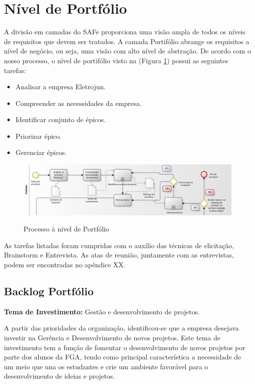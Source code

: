 \section {Nível de Portfólio}

A divisão em camadas do SAFe proporciona uma visão ampla de todos os níveis de requisitos que devem ser tratados. A camada Portifólio abrange os requisitos a nível de negócio, ou seja, uma visão com alto nível de abstração. De acordo com o nosso processo, o nível de portifólio visto na (Figura \ref{img:portfolio}) possui as seguintes tarefas:

\begin{itemize}
\item Analisar a empresa Eletrojun.
\item Compreender as necessidades da empresa.
\item Identificar conjunto de épicos.
\item Priorizar épico.
\item Gerenciar épicos.
\end{itemize}

\FloatBarrier
\begin{figure}[!htpd]
		\centering
		\includegraphics[scale=0.4]{figuras/portfolio}
		\label{img:portfolio}
		\caption{Processo à nível de Portfólio}
\end{figure}

As tarefas listadas foram cumpridas com o auxílio das técnicas de elicitação, Brainstorm e Entrevista. As atas de reunião, juntamente com as entrevistas, podem ser encontradas no apêndice XX.

\subsection {Backlog Portfólio}

\textbf{Tema de Investimento:} Gestão e desenvolvimento de projetos.

 A partir das prioridades da organização, identificou-se que a empresa desejava investir na Gerência e Desenvolvimento de novos projetos. Este tema de investimento tem a função de fomentar o desenvolvimento de novos projetos por parte dos alunos da FGA, tendo como principal característica a necessidade de um meio que una os estudantes e crie um ambiente favorável para o desenvolvimento de ideias e projetos.

